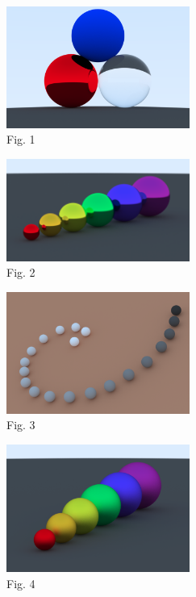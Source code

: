 \documentclass[conference]{IEEEtran}
\begin{document}
\begin{figure}[H]
\includegraphics[width=6cm]{images/Scene1.png}
\centering\\
Fig. 1
\end{figure}

\begin{figure}[H]
\includegraphics[width=6cm]{images/Scene3.png}
\centering\\
Fig. 2
\end{figure}

\begin{figure}[H]
\includegraphics[width=6cm]{images/Scene4.png}
\centering\\
Fig. 3
\end{figure}

\begin{figure}[H]
\includegraphics[width=6cm]{images/Scene2.png}
\centering\\
Fig. 4
\end{figure}
\end{document}
